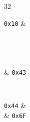 \begin{bytefield}[
	leftcurly=.,
	leftcurlyspace=0pt,
	bitformatting={\small\ttfamily},
	boxformatting={\centering\small},
	endianness=big]{32}
	\begin{leftwordgroup}{\texttt{0x10} & \\ \\ \\ \\ \\ & \texttt{0x43}}
	\end{leftwordgroup} \\
	\begin{leftwordgroup}{\texttt{0x44} & \\[16em] & \texttt{0x6F}}
	\end{leftwordgroup}
\end{bytefield}
